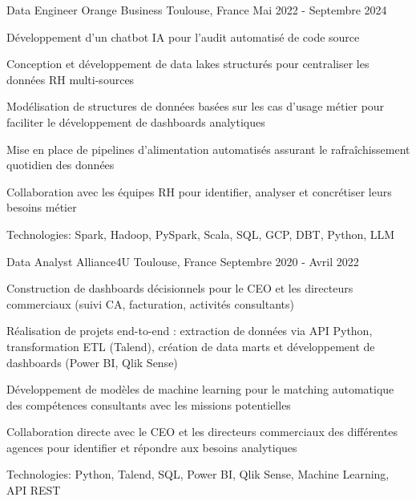 \begin{cventries}
\cventry
{Data Engineer} %
{Orange Business} %
{Toulouse, France} %
{Mai 2022 - Septembre 2024} %
{ %
\begin{cvitems}
\item {Développement d'un chatbot IA pour l'audit automatisé de code source}
\item {Conception et développement de data lakes structurés pour centraliser les données RH multi-sources}
\item {Modélisation de structures de données basées sur les cas d'usage métier pour faciliter le développement de dashboards analytiques}
\item {Mise en place de pipelines d'alimentation automatisés assurant le rafraîchissement quotidien des données}
\item {Collaboration avec les équipes RH pour identifier, analyser et concrétiser leurs besoins métier}
\item {Technologies: Spark, Hadoop, PySpark, Scala, SQL, GCP, DBT, Python, LLM}
\end{cvitems}
}
\vspace{1.5em}


\cventry
{Data Analyst} %
{Alliance4U} %
{Toulouse, France} %
{Septembre 2020 - Avril 2022} %
{ %
\begin{cvitems}
\item {Construction de dashboards décisionnels pour le CEO et les directeurs commerciaux (suivi CA, facturation, activités consultants)}
\item {Réalisation de projets end-to-end : extraction de données via API Python, transformation ETL (Talend), création de data marts et développement de dashboards (Power BI, Qlik Sense)}
\item {Développement de modèles de machine learning pour le matching automatique des compétences consultants avec les missions potentielles}
\item {Collaboration directe avec le CEO et les directeurs commerciaux des différentes agences pour identifier et répondre aux besoins analytiques}
\item {Technologies: Python, Talend, SQL, Power BI, Qlik Sense, Machine Learning, API REST}
\end{cvitems}
}
\vspace{1.5em}


\end{cventries}
